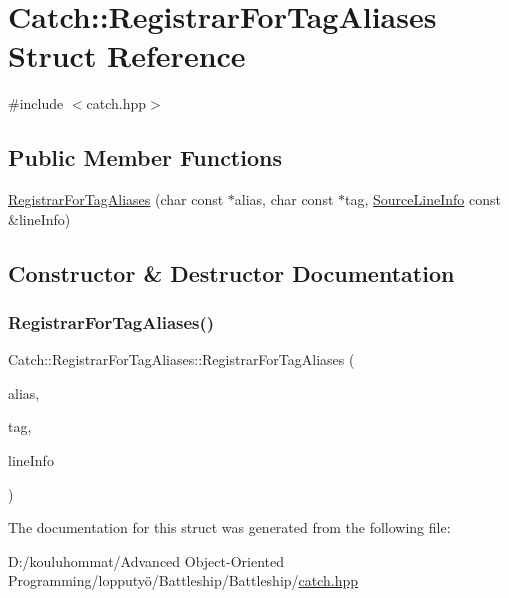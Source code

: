 \hypertarget{struct_catch_1_1_registrar_for_tag_aliases}{}\section{Catch\+:\+:Registrar\+For\+Tag\+Aliases Struct Reference}
\label{struct_catch_1_1_registrar_for_tag_aliases}


{\ttfamily \#include $<$catch.\+hpp$>$}

\subsection*{Public Member Functions}
\begin{DoxyCompactItemize}
\item 
\mbox{\hyperlink{struct_catch_1_1_registrar_for_tag_aliases_ae4e45830e4763bcd65d55d8db9167b69}{Registrar\+For\+Tag\+Aliases}} (char const $\ast$alias, char const $\ast$tag, \mbox{\hyperlink{struct_catch_1_1_source_line_info}{Source\+Line\+Info}} const \&line\+Info)
\end{DoxyCompactItemize}


\subsection{Constructor \& Destructor Documentation}
\mbox{\label{struct_catch_1_1_registrar_for_tag_aliases_ae4e45830e4763bcd65d55d8db9167b69}} 
\subsubsection{\texorpdfstring{Registrar\+For\+Tag\+Aliases()}{RegistrarForTagAliases()}}
{\footnotesize\ttfamily Catch\+::\+Registrar\+For\+Tag\+Aliases\+::\+Registrar\+For\+Tag\+Aliases (\begin{DoxyParamCaption}\item[{char const $\ast$}]{alias,  }\item[{char const $\ast$}]{tag,  }\item[{\mbox{\hyperlink{struct_catch_1_1_source_line_info}{Source\+Line\+Info}} const \&}]{line\+Info }\end{DoxyParamCaption})}



The documentation for this struct was generated from the following file\+:\begin{DoxyCompactItemize}
\item 
D\+:/kouluhommat/\+Advanced Object-\/\+Oriented Programming/lopputyö/\+Battleship/\+Battleship/\mbox{\hyperlink{catch_8hpp}{catch.\+hpp}}\end{DoxyCompactItemize}
